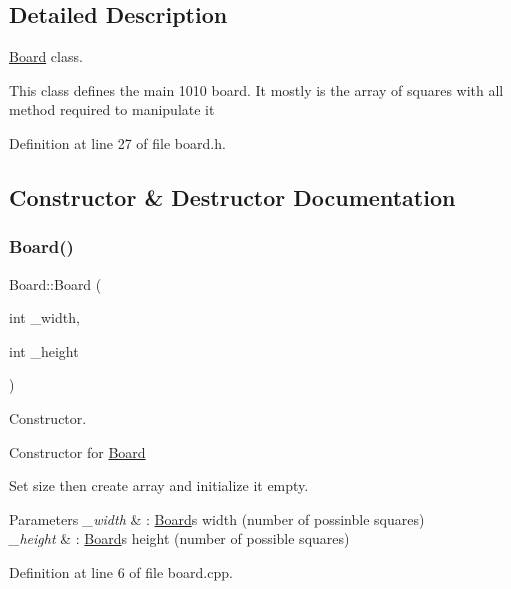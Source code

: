 \subsection{Detailed Description}
\hyperlink{class_board}{Board} class. 

This class defines the main 1010 board. It mostly is the array of squares with all method required to manipulate it 

Definition at line 27 of file board.\+h.



\subsection{Constructor \& Destructor Documentation}
\hypertarget{class_board_a815539526352256b76c07aaeb633dbb7}{}\label{class_board_a815539526352256b76c07aaeb633dbb7} 
\subsubsection{\texorpdfstring{Board()}{Board()}\hspace{0.1cm}{\footnotesize\ttfamily [1/2]}}
{\footnotesize\ttfamily Board\+::\+Board (\begin{DoxyParamCaption}\item[{int}]{\+\_\+width,  }\item[{int}]{\+\_\+height }\end{DoxyParamCaption})}



Constructor. 

Constructor for \hyperlink{class_board}{Board}

Set size then create array and initialize it empty.


\begin{DoxyParams}{Parameters}
{\em \+\_\+width} & \+: \hyperlink{class_board}{Board}\textquotesingle{}s width (number of possinble squares) \\
\hline
{\em \+\_\+height} & \+: \hyperlink{class_board}{Board}\textquotesingle{}s height (number of possible squares) \\
\hline
\end{DoxyParams}


Definition at line 6 of file board.\+cpp.

\hypertarget{class_board_a467d2914714aa66a5b29e963ea4bf30b}{}\label{class_board_a467d2914714aa66a5b29e963ea4bf30b} 
